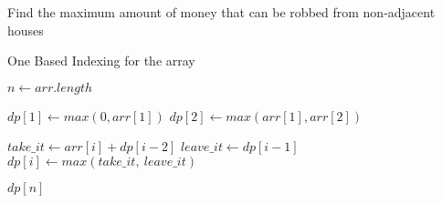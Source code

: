 \documentclass[12pt]{article}
\begin{document}
\begin{algorithm}

  \caption{Find the maximum amount of money that can be robbed from non-adjacent houses}
\begin{algorithmic}[1]
    \Ensure One Based Indexing for the array
    \Statex
    
    
        
        \Statex
        \State $n \gets arr.length$
        
        
        \State $dp[1] \gets max(0,arr[1])$
        \State $dp[2] \gets max(arr[1],arr[2])$
        
        
            \State $take\_it \gets arr[i] + dp[i-2]$
            \State $leave\_it \gets dp[i-1]$
            \State $dp[i] \gets max(take\_it, \ leave\_it)$
        \EndFor
        
        \Statex
        
        \State \Return $dp[n]$
        
    \EndFunction
  \end{algorithmic}
  
\end{algorithm}
\end{document}
